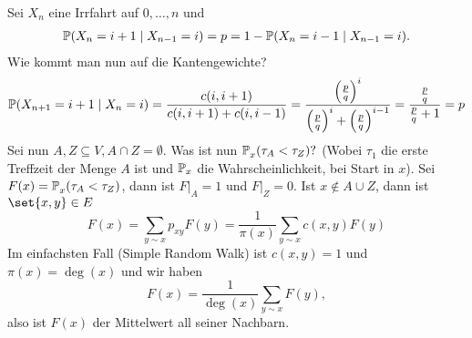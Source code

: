 \begin{beispiel} 
	\label{bsp:GamblersRun}
	Sei $X_n$ eine Irrfahrt auf $0, \dots, n$ und	
	\begin{gather}
		\prop{X_n = i+1 \given X_{n-1} = i} = p = 1 - \prop{X_n = i-1 \given X_{n-1} = i}.
	\end{gather}
	Wie kommt man nun auf die Kantengewichte?
	\begin{gather}
		\prop{X_{n+1} = i+1 \given X_n = i} = \frac{c(i,i+1)}{c(i,i+1)+c(i,i-1)} = \frac{\enb{\frac{p}{q}}^i}{\enb{\frac{p}{q}}^i + \enb{\frac{p}{q}}^{i-1}} = \frac{\frac{p}{q}}{\frac{p}{q} +1} = p
	\end{gather}
	Sei nun $A,Z \subseteq V, A \cap Z = \emptyset$. Was ist nun $\prop{\tau_A < \tau_Z}[][x]?$ (Wobei $\tau_1$ die erste Treffzeit der Menge $A$ ist und $\mathbb{P}_x$ die Wahrscheinlichkeit, bei Start in $x$). Sei $F(x) = \prop{\tau_A < \tau_Z}[][x]$, dann ist $F|_A = 1$ und $F|_Z = 0$. Ist $x \notin A \cup Z$, dann ist $\set{x,y} \in E$ 
	\begin{equation}
		F(x) = \sum\limits_{y \sim x} p_{xy} F(y) = \frac{1}{\pi(x)} \sum\limits_{y \sim x} c(x,y)F(y) \tag{*} \label{eqn:GamblersRun}
	\end{equation}
	Im einfachsten Fall (Simple Random Walk) ist $c(x,y) = 1$ und $\pi(x) = \deg(x)$  und wir haben
	\begin{equation}
		F(x) = \frac{1}{\deg(x)} \sum\limits_{y \sim x} F(y),
	\end{equation}
	also ist $F(x)$ der Mittelwert all seiner Nachbarn. 
\end{beispiel}

